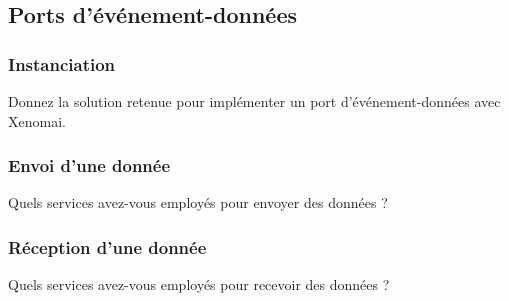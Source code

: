 \documentclass[11pt, a4paper]{paper}
\begin{document}
\subsection{Ports d’événement-données}

\subsubsection{Instanciation}
 {\color{blue} Donnez la solution retenue pour implémenter un port d'événement-données avec Xenomai.}

\subsubsection{Envoi d’une donnée}
 {\color{blue} Quels services avez-vous employés pour envoyer des données ?}

\subsubsection{Réception d’une donnée}
 {\color{blue} Quels services avez-vous employés pour recevoir des données ?}
 
\end{document}
